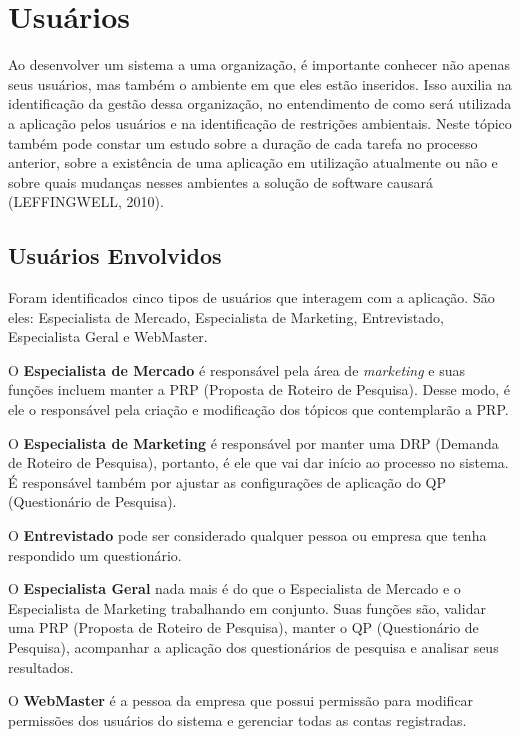 \section{Usuários}
	Ao desenvolver um sistema a uma organização, é importante conhecer não apenas seus usuários, mas também o ambiente em que eles estão inseridos. Isso auxilia na identificação da gestão dessa organização, no entendimento de como será utilizada a aplicação pelos usuários e na identificação de restrições ambientais. Neste tópico também pode constar um estudo sobre a duração de cada tarefa no processo anterior, sobre a existência de uma aplicação em utilização atualmente ou não e sobre quais mudanças nesses ambientes a solução de software causará (LEFFINGWELL, 2010).

	\subsection{Usuários Envolvidos}
		Foram identificados cinco tipos de usuários que interagem com a aplicação. São eles: Especialista de Mercado, Especialista de Marketing, Entrevistado, Especialista Geral e WebMaster.


		\begin{itemize}
		{

			\item O \textbf{Especialista de Mercado} é responsável pela área de \textit{marketing} e suas funções incluem manter a PRP (Proposta de Roteiro de Pesquisa). Desse modo, é ele o responsável pela criação e modificação dos tópicos que contemplarão a PRP.
			
			\item O \textbf{Especialista de Marketing} é responsável por manter uma DRP (Demanda de Roteiro de Pesquisa), portanto, é ele que vai dar início ao processo no sistema. É responsável também por ajustar as configurações de aplicação do QP (Questionário de Pesquisa).
			
			\item O \textbf{Entrevistado} pode ser considerado qualquer pessoa ou empresa que tenha respondido um questionário.
			
			\item O \textbf{Especialista Geral} nada mais é do que o Especialista de Mercado e o Especialista de Marketing trabalhando em conjunto. Suas funções são, validar uma PRP (Proposta de Roteiro de Pesquisa), manter o QP (Questionário de Pesquisa), acompanhar a aplicação dos questionários de pesquisa e analisar seus resultados.
			
			\item O \textbf{WebMaster} é a pessoa da empresa que possui permissão para modificar permissões dos usuários do sistema e gerenciar todas as contas registradas.

		}
		\end{itemize}
